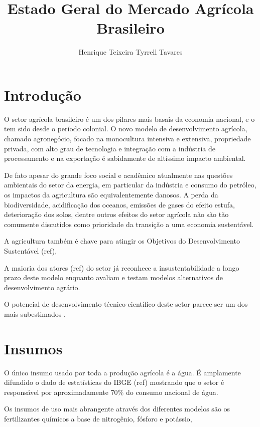 \documentclass[]{article}
\title{Estado Geral do Mercado Agrícola Brasileiro}
\author{Henrique Teixeira Tyrrell Tavares}
\begin{document}
\maketitle

\begin{abstract}

\end{abstract}

\section{Introdução}

O setor agrícola brasileiro é um dos pilares mais basais da economia nacional, e o tem sido desde o período colonial. O novo modelo de desenvolvimento agrícola, chamado agronegócio, focado na monocultura intensiva e extensiva, propriedade privada, com alto grau de tecnologia  e integração com a indústria de processamento e na exportação é sabidamente de altíssimo impacto ambiental.

De fato apesar do grande foco social e acadêmico atualmente nas questões ambientais do setor da energia, em particular da indústria e consumo do petróleo, os impactos da agricultura são equivalentemente danosos. A perda da biodiversidade, acidificação dos oceanos, emissões de gases do efeito estufa, deterioração dos solos, dentre outros efeitos do setor agrícola não são tão comumente discutidos como prioridade da transição a uma economia sustentável. 

A agricultura também é chave para atingir os Objetivos do Desenvolvimento Sustentável (ref), 

A maioria dos atores (ref) do setor já reconhece a insustentabilidade a longo prazo deste modelo enquanto avaliam e testam modelos alternativos de desenvolvimento agrário. 

O potencial de desenvolvimento técnico-científico deste setor parece ser um dos mais subestimados .



\section{Insumos}

O único insumo usado por toda a produção agrícola é a água. É amplamente difundido o dado de estatísticas do IBGE (ref) mostrando que o setor é responsável por aproximadamente $70\%$ do consumo nacional de água. 

Os insumos de uso mais abrangente através dos diferentes modelos são os fertilizantes químicos a base de nitrogênio, fósforo e potássio,  
\end{document}
